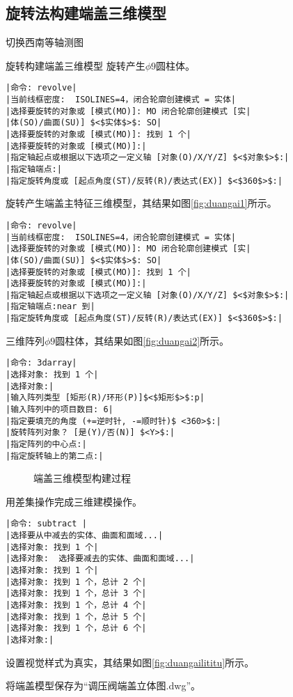 \subsection{旋转法构建端盖三维模型}
\begin{procedure}
\item 切换西南等轴测图

\item 旋转构建端盖三维模型
旋转产生$\phi 9$圆柱体。
\begin{lstlisting}
|命令: revolve|
|当前线框密度:  ISOLINES=4，闭合轮廓创建模式 = 实体|
|选择要旋转的对象或 [模式(MO)]: MO 闭合轮廓创建模式 [实|
|体(SO)/曲面(SU)] $<$实体$>$: SO|
|选择要旋转的对象或 [模式(MO)]: 找到 1 个|
|选择要旋转的对象或 [模式(MO)]:|
|指定轴起点或根据以下选项之一定义轴 [对象(O)/X/Y/Z] $<$对象$>$:|
|指定轴端点:|
|指定旋转角度或 [起点角度(ST)/反转(R)/表达式(EX)] $<$360$>$:|
\end{lstlisting}
旋转产生端盖主特征三维模型，其结果如图\ref{fig:duangai1}所示。

\begin{lstlisting}
|命令: revolve|
|当前线框密度:  ISOLINES=4，闭合轮廓创建模式 = 实体|
|选择要旋转的对象或 [模式(MO)]: MO 闭合轮廓创建模式 [实|
|体(SO)/曲面(SU)] $<$实体$>$: SO|
|选择要旋转的对象或 [模式(MO)]: 找到 1 个|
|选择要旋转的对象或 [模式(MO)]:|
|指定轴起点或根据以下选项之一定义轴 [对象(O)/X/Y/Z] $<$对象$>$:|
|指定轴端点:near 到|
|指定旋转角度或 [起点角度(ST)/反转(R)/表达式(EX)] $<$360$>$:|
\end{lstlisting}
\item 三维阵列$\phi 9$圆柱体，其结果如图\ref{fig:duangai2}所示。
\begin{lstlisting}
|命令: 3darray|
|选择对象: 找到 1 个|
|选择对象:|
|输入阵列类型 [矩形(R)/环形(P)]$<$矩形$>$:p|
|输入阵列中的项目数目: 6|
|指定要填充的角度 (+=逆时针, -=顺时针)$ <360>$:|
|旋转阵列对象？ [是(Y)/否(N)] $<Y>$:|
|指定阵列的中心点:|
|指定旋转轴上的第二点:|
\end{lstlisting}
\begin{figure}[htbp]
\centering
{}\hspace{30pt}
\hspace{30pt}
\caption{端盖三维模型构建过程}
\end{figure}
\item 用差集操作完成三维建模操作。
\begin{lstlisting}
|命令: subtract |
|选择要从中减去的实体、曲面和面域...|
|选择对象: 找到 1 个|
|选择对象:  选择要减去的实体、曲面和面域...|
|选择对象: 找到 1 个|
|选择对象: 找到 1 个，总计 2 个|
|选择对象: 找到 1 个，总计 3 个|
|选择对象: 找到 1 个，总计 4 个|
|选择对象: 找到 1 个，总计 5 个|
|选择对象: 找到 1 个，总计 6 个|
|选择对象:|
\end{lstlisting}
\item 设置视觉样式为真实，其结果如图\ref{fig:duangailititu}所示。
\item 将端盖模型保存为“调压阀端盖立体图.dwg”。
\end{procedure}
\endinput